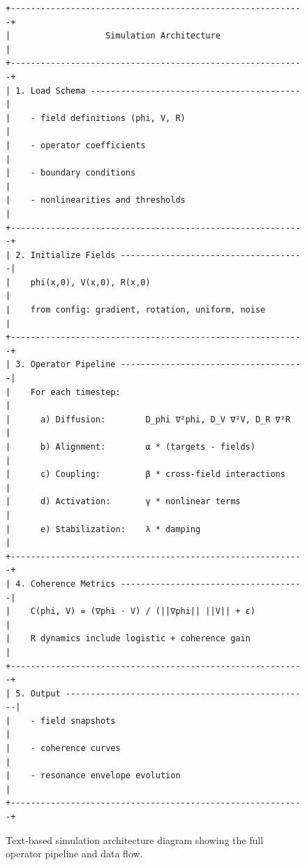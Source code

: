 \begin{figure}[h]
\centering
\begin{verbatim}
+-----------------------------------------------------------+
|                   Simulation Architecture                 |
+-----------------------------------------------------------+
| 1. Load Schema ------------------------------------------ |
|    - field definitions (phi, V, R)                        |
|    - operator coefficients                                |
|    - boundary conditions                                  |
|    - nonlinearities and thresholds                        |
+-----------------------------------------------------------+
| 2. Initialize Fields -------------------------------------|
|    phi(x,0), V(x,0), R(x,0)                               |
|    from config: gradient, rotation, uniform, noise        |
+-----------------------------------------------------------+
| 3. Operator Pipeline -------------------------------------|
|    For each timestep:                                     |
|      a) Diffusion:        D_phi ∇²phi, D_V ∇²V, D_R ∇²R   |
|      b) Alignment:        α * (targets - fields)          |
|      c) Coupling:         β * cross-field interactions    |
|      d) Activation:       γ * nonlinear terms             |
|      e) Stabilization:    λ * damping                     |
+-----------------------------------------------------------+
| 4. Coherence Metrics -------------------------------------|
|    C(phi, V) = (∇phi · V) / (||∇phi|| ||V|| + ε)          |
|    R dynamics include logistic + coherence gain           |
+-----------------------------------------------------------+
| 5. Output -------------------------------------------------|
|    - field snapshots                                      |
|    - coherence curves                                     |
|    - resonance envelope evolution                         |
+-----------------------------------------------------------+
\end{verbatim}
\caption{Text-based simulation architecture diagram showing the full
operator pipeline and data flow.}
\label{fig:sim-architecture}
\end{figure}
